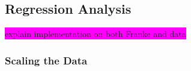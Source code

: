 \documentclass[aps,pra,english,notitlepage,reprint,nofootinbib]{revtex4-1}  %
\begin{document}





\subsection{Regression Analysis}
\colorbox{magenta}{explain implementation on both Franke and data}

\subsubsection{Scaling the Data}
\end{document}

